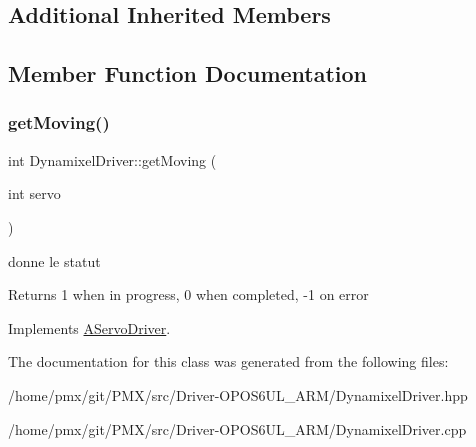 \subsection*{Additional Inherited Members}


\subsection{Member Function Documentation}
\mbox{\label{classDynamixelDriver_a142a774bb716628483fa010727b84cdb}} 
\subsubsection{\texorpdfstring{get\+Moving()}{getMoving()}}
{\footnotesize\ttfamily int Dynamixel\+Driver\+::get\+Moving (\begin{DoxyParamCaption}\item[{int}]{servo }\end{DoxyParamCaption})\hspace{0.3cm}{\ttfamily [virtual]}}



donne le statut 

\begin{DoxyReturn}{Returns}
1 when in progress, 0 when completed, -\/1 on error 
\end{DoxyReturn}


Implements \hyperlink{classAServoDriver_a954ac7340407b997387d84d7059ed32b}{A\+Servo\+Driver}.



The documentation for this class was generated from the following files\+:\begin{DoxyCompactItemize}
\item 
/home/pmx/git/\+P\+M\+X/src/\+Driver-\/\+O\+P\+O\+S6\+U\+L\+\_\+\+A\+R\+M/Dynamixel\+Driver.\+hpp\item 
/home/pmx/git/\+P\+M\+X/src/\+Driver-\/\+O\+P\+O\+S6\+U\+L\+\_\+\+A\+R\+M/Dynamixel\+Driver.\+cpp\end{DoxyCompactItemize}
